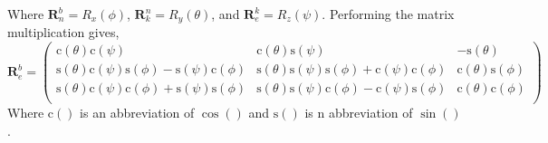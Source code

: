 \documentclass{article}
\begin{document}
	Where $\mathbf{R}_n^b = R_x(\phi)$, $\mathbf{R}_k^n = R_y(\theta)$, and $\mathbf{R}_e^k = R_z(\psi)$.  Performing the matrix multiplication gives,
	\begin{equation}
		\mathbf{R}_e^b = \left(
		\begin{array}{ccc}
			\text{c} (\theta ) \text{c} (\psi ) & \text{c} (\theta ) \text{s}  (\psi ) & -\text{s}  (\theta ) \\
			\text{s}  (\theta ) \text{c} (\psi ) \text{s}  (\phi )-\text{s}  (\psi ) \text{c} (\phi ) & \text{s}  (\theta ) \text{s}  (\psi ) \text{s}  (\phi )+\text{c} (\psi ) \text{c} (\phi ) & \text{c} (\theta ) \text{s}  (\phi ) \\
			\text{s}  (\theta ) \text{c} (\psi ) \text{c} (\phi )+\text{s}  (\psi ) \text{s}  (\phi ) & \text{s}  (\theta ) \text{s}  (\psi ) \text{c} (\phi )-\text{c} (\psi ) \text{s}  (\phi ) & \text{c} (\theta ) \text{c} (\phi ) \\
		\end{array}
		\right)
	\end{equation}
	Where $\text{c}()$ is an abbreviation of $\cos()$ and $\text{s}()$ is n abbreviation of $\sin()$. 
\end{document}
